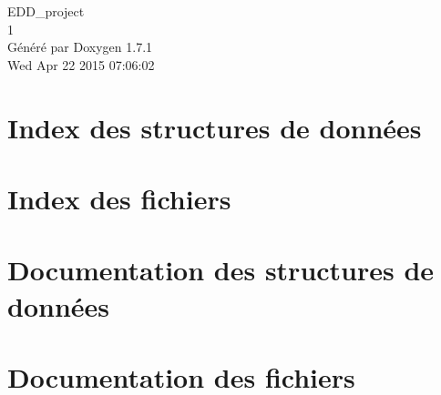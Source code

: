 \documentclass[a4paper]{book}
\begin{document}
\hypersetup{pageanchor=false}
\begin{titlepage}
\vspace*{7cm}
\begin{center}
{\Large EDD\_\-project \\[1ex]\large 1 }\\
\vspace*{1cm}
{\large Généré par Doxygen 1.7.1}\\
\vspace*{0.5cm}
{\small Wed Apr 22 2015 07:06:02}\\
\end{center}
\end{titlepage}
\clearemptydoublepage
{}
\tableofcontents
\clearemptydoublepage
{}
\hypersetup{pageanchor=true}
\chapter{Index des structures de données}

\chapter{Index des fichiers}

\chapter{Documentation des structures de données}






\chapter{Documentation des fichiers}















\printindex
\end{document}

